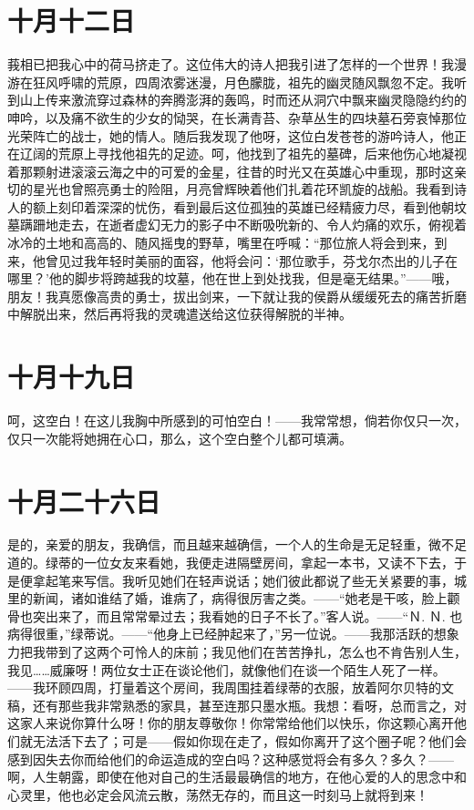 \documentclass[12pt,oneside]{book}
\begin{document}
\chapter{十月十二日}
\label{sec-4-18}
莪相已把我心中的荷马挤走了。这位伟大的诗人把我引进了怎样的一个世界！我漫游在狂风呼啸的荒原，四周浓雾迷漫，月色朦胧，祖先的幽灵随风飘忽不定。我听到山上传来激流穿过森林的奔腾澎湃的轰鸣，时而还从洞穴中飘来幽灵隐隐约约的呻吟，以及痛不欲生的少女的恸哭，在长满青苔、杂草丛生的四块墓石旁哀悼那位光荣阵亡的战士，她的情人。随后我发现了他呀，这位白发苍苍的游吟诗人，他正在辽阔的荒原上寻找他祖先的足迹。呵，他找到了祖先的墓碑，后来他伤心地凝视着那颗射进滚滚云海之中的可爱的金星，往昔的时光又在英雄心中重现，那时这亲切的星光也曾照亮勇士的险阻，月亮曾辉映着他们扎着花环凯旋的战船。我看到诗人的额上刻印着深深的忧伤，看到最后这位孤独的英雄已经精疲力尽，看到他朝坟墓蹒跚地走去，在逝者虚幻无力的影子中不断吸吮新的、令人灼痛的欢乐，俯视着冰冷的土地和高高的、随风摇曳的野草，嘴里在呼喊：“那位旅人将会到来，到来，他曾见过我年轻时美丽的面容，他将会问：‘那位歌手，芬戈尔杰出的儿子在哪里？’他的脚步将跨越我的坟墓，他在世上到处找我，但是毫无结果。”——哦，朋友！我真愿像高贵的勇士，拔出剑来，一下就让我的侯爵从缓缓死去的痛苦折磨中解脱出来，然后再将我的灵魂遣送给这位获得解脱的半神。
　　

\chapter{十月十九日}
\label{sec-4-19}
呵，这空白！在这儿我胸中所感到的可怕空白！——我常常想，倘若你仅只一次，仅只一次能将她拥在心口，那么，这个空白整个儿都可填满。
　　
\chapter{十月二十六日}
\label{sec-4-20}
是的，亲爱的朋友，我确信，而且越来越确信，一个人的生命是无足轻重，微不足道的。绿蒂的一位女友来看她，我便走进隔壁房间，拿起一本书，又读不下去，于是便拿起笔来写信。我听见她们在轻声说话；她们彼此都说了些无关紧要的事，城里的新闻，诸如谁结了婚，谁病了，病得很厉害之类。——“她老是干咳，脸上颧骨也突出来了，而且常常晕过去；我看她的日子不长了。”客人说。——“Ｎ. Ｎ. 也病得很重，”绿蒂说。——“他身上已经肿起来了，”另一位说。——我那活跃的想象力把我带到了这两个可怜人的床前；我见他们在苦苦挣扎，怎么也不肯告别人生，我见……威廉呀！两位女士正在谈论他们，就像他们在谈一个陌生人死了一样。——我环顾四周，打量着这个房间，我周围挂着绿蒂的衣服，放着阿尔贝特的文稿，还有那些我非常熟悉的家具，甚至连那只墨水瓶。我想：看呀，总而言之，对这家人来说你算什么呀！你的朋友尊敬你！你常常给他们以快乐，你这颗心离开他们就无法活下去了；可是——假如你现在走了，假如你离开了这个圈子呢？他们会感到因失去你而给他们的命运造成的空白吗？这种感觉将会有多久？多久？——啊，人生朝露，即使在他对自己的生活最最确信的地方，在他心爱的人的思念中和心灵里，他也必定会风流云散，荡然无存的，而且这一时刻马上就将到来！
　　
\end{document}
